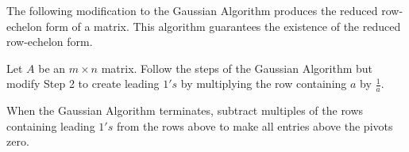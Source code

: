 \documentclass{ximera}
\begin{document}
The following modification to the Gaussian Algorithm produces the reduced row-echelon form of a matrix.  This algorithm guarantees the existence of the reduced row-echelon form.
 
\begin{algorithm} \label{alg:gauss-jordan}
Let $A$ be an $m\times n$ matrix.
Follow the steps of the Gaussian Algorithm but modify Step 2 to create leading $1's$ by multiplying the row containing $a$ by $\frac{1}{a}$.
 
 
 
 
 
When the Gaussian Algorithm terminates, subtract multiples of the rows containing leading $1's$ from the rows above to make all entries above the pivots zero.
\end{algorithm}
 
 
\end{document}
